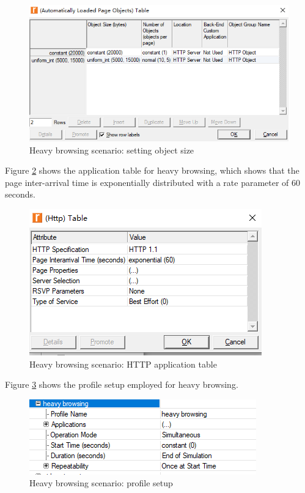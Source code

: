 \begin{figure}[H]
	\centering
	\includegraphics[scale=0.6]{Figures/amantianrenamed/ScenariooneHeavybrowsingobjectsize.png}
	\caption{Heavy browsing scenario: setting object size}
	\label{fig:simul:riverbed:heavy:1}
\end{figure}

Figure \ref{fig:simul:riverbed:heavy:2} shows the application table for heavy browsing, which shows that the page inter-arrival time is exponentially distributed with a rate parameter of 60 seconds.

\begin{figure}[H]
	\centering
	\includegraphics[scale=0.6]{Figures/amantianrenamed/ScenariooneHttpapplicationtableforheavybrowsing.png}
	\caption[Heavy browsing scenario: HTTP application table]{Heavy browsing scenario: \gls{HTTP} application table}
	\label{fig:simul:riverbed:heavy:2}
\end{figure}

Figure \ref{fig:simul:riverbed:heavy:3} shows the profile setup employed for heavy browsing.

\begin{figure}[H]
	\centering
	\includegraphics[scale=0.6]{Figures/amantianrenamed/ScenariooneHeavyBrowsingProfilesetup.png}
	\caption{Heavy browsing scenario: profile setup}
	\label{fig:simul:riverbed:heavy:3}
\end{figure}


